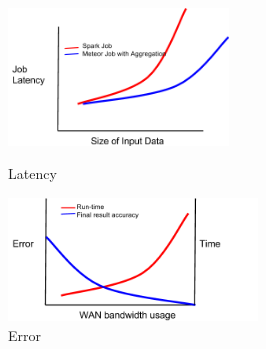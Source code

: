 \documentclass{article}
\begin{document}
\begin{figure}[ht]
	\centering
	\begin{minipage}[b]{0.45\linewidth}
		\includegraphics[width=2.3in]{fig_1.png}
		\caption{Latency}
		\label{fig:minipage1}
	\end{minipage}
	\quad
	\begin{minipage}[b]{0.45\linewidth}
		\includegraphics[width=2.6in]{fig_2.png}
		\caption{Error}
		\label{fig:minipage2}
	\end{minipage}
\end{figure}

\end{document}
